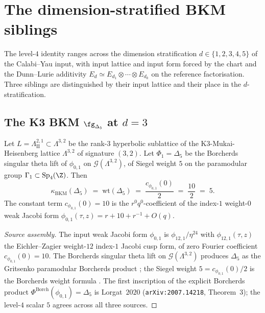 \section{The dimension-stratified BKM siblings}
\label{sec:terminus-bkm-siblings}

The level-$4$ identity ranges across the dimension stratification
$d \in \{1, 2, 3, 4, 5\}$ of the Calabi--Yau input, with input
lattice and input form forced by the chart and the Dunn--Lurie
additivity $E_d \simeq E_{d_1} \otimes \cdots \otimes E_{d_k}$ on
the reference factorisation.  Three siblings are distinguished by
their input lattice and their place in the $d$-stratification.

\subsection{The K3 BKM $\fg_{\Delta_5}$ at $d = 3$}
\label{subsec:terminus-k3-bkm-d3}

\begin{theorem}[K3-side BKM Borcherds weight at $d = 3$]
\label{thm:terminus-k3-bkm-weight}
Let $L = \Lambda^{2, 1}_{\mathrm{II}} \subset \Lambda^{3, 2}$ be
the rank-$3$ hyperbolic sublattice of the K3-Mukai-Heisenberg
lattice $\Lambda^{3, 2}$ of signature $(3, 2)$.  Let $\Phi_1 =
\Delta_5$ be the Borcherds singular theta lift of $\phi_{0, 1}$ on
$\mathcal G(\Lambda^{3, 2})$, of Siegel weight $5$ on the
paramodular group $\Gamma_1 \subset \mathrm{Sp}_4(\Z)$.  Then
\[
 \kappa_{\mathrm{BKM}}(\Delta_5) \;=\; \mathrm{wt}(\Delta_5) \;=\;
 \frac{c_{\phi_{0, 1}}(0)}{2} \;=\; \frac{10}{2} \;=\; 5.
\]
The constant term $c_{\phi_{0, 1}}(0) = 10$ is the
$r^0 q^0$-coefficient of the index-$1$ weight-$0$ weak Jacobi form
$\phi_{0, 1}(\tau, z) = r + 10 + r^{-1} + O(q)$.
\end{theorem}

\begin{proof}[Source assembly]
The input weak Jacobi form $\phi_{0, 1}$ is $\phi_{12, 1}/\eta^{24}$
with $\phi_{12, 1}(\tau, z)$ the Eichler--Zagier weight-$12$
index-$1$ Jacobi cusp form, of zero Fourier coefficient
$c_{\phi_{0, 1}}(0) = 10$.  The Borcherds singular theta lift on
$\mathcal G(\Lambda^{3, 2})$ produces $\Delta_5$ as the Gritsenko
paramodular Borcherds product
\cite[Part~II, Theorem~2.1]{GritsenkoNikulin1995}; the Siegel weight
$5 = c_{\phi_{0, 1}}(0)/2$ is the Borcherds weight formula
\cite[Theorem~13.3]{Borcherds1998}.  The first inscription of the
explicit Borcherds product $\Phi^{\mathrm{Borch}}(\phi_{0, 1}) =
\Delta_5$ is Lorgat~$2020$ (\texttt{arXiv:2007.14218}, Theorem~$3$);
the level-$4$ scalar $5$ agrees across all three sources.
\end{proof}

